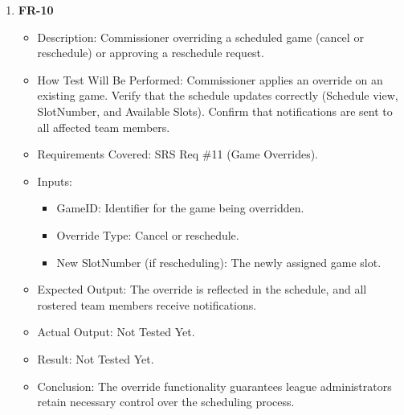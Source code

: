\documentclass[12pt, titlepage]{article}
\begin{document}
\begin{enumerate}
    \item \textbf{FR-10}  
      \begin{itemize}
          \item Description: Commissioner overriding a scheduled game (cancel or reschedule) or approving a reschedule request.
          \item How Test Will Be Performed: Commissioner applies an override on an existing game. Verify that the schedule updates correctly (Schedule view, SlotNumber, and Available Slots). Confirm that notifications are sent to all affected team members.
          \item Requirements Covered: SRS Req \#11 (Game Overrides).
          \item Inputs:  
              \begin{itemize}
                  \item GameID: Identifier for the game being overridden.  
                  \item Override Type: Cancel or reschedule.  
                  \item New SlotNumber (if rescheduling): The newly assigned game slot.  
              \end{itemize}
          \item Expected Output: The override is reflected in the schedule, and all rostered team members receive notifications.
          \item Actual Output: Not Tested Yet.
          \item Result: Not Tested Yet.
          \item Conclusion: The override functionality guarantees league administrators retain necessary control over the scheduling process.
      \end{itemize}


\end{enumerate}
\end{document}
